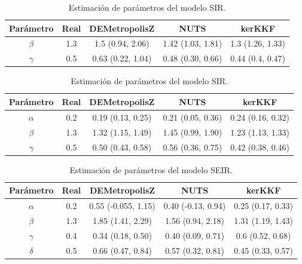 \begin{table}[h!]
    \centering
    \caption{Estimación de parámetros del modelo SIR.} 
    \begin{tabular}{|c|c|c|c|c|}
    \hline
    \textbf{Parámetro} & \textbf{Real} & \textbf{DEMetropolisZ} & \textbf{NUTS} & \textbf{kerKKF}  \\ \hline
    $\beta$ & 1.3 & 1.5 (0.94, 2.06) & 1.42 (1.03, 1.81) & 1.3 (1.26, 1.33) \\ \hline
    $\gamma$ & 0.5 & 0.63 (0.22, 1.04) & 0.48 (0.30, 0.66) & 0.44 (0.4, 0.47) \\ \hline
    \end{tabular}
    \label{tab:SIR_params}
\end{table}

\begin{table}[h!]
    \centering
    \caption{Estimación de parámetros del modelo SIR.} 
    \begin{tabular}{|c|c|c|c|c|}
    \hline
    \textbf{Parámetro}& \textbf{Real} & \textbf{DEMetropolisZ} & \textbf{NUTS} & \textbf{kerKKF}  \\ \hline
    $\alpha$ & 0.2 & 0.19 (0.13, 0.25) & 0.21 (0.05, 0.36) & 0.24 (0.16, 0.32) \\ \hline
    $\beta$ & 1.3 & 1.32 (1.15, 1.49) & 1.45 (0.99, 1.90) & 1.23 (1.13, 1.33) \\ \hline
    $\gamma$ & 0.5 & 0.50 (0.43, 0.58) & 0.56 (0.36, 0.75) & 0.42 (0.38, 0.46) \\ \hline
    \end{tabular}
    \label{tab:SIR_params}
\end{table}

\begin{table}[h!]
    \centering
    \caption{Estimación de parámetros del modelo SEIR.} 
    \begin{tabular}{|c|c|c|c|c|}
    \hline
    \textbf{Parámetro}& \textbf{Real} & \textbf{DEMetropolisZ} & \textbf{NUTS} & \textbf{kerKKF}  \\ \hline
    $\alpha$ & 0.2 & 0.55 (-0.055, 1.15) & 0.40 (-0.13, 0.94) & 0.25 (0.17, 0.33) \\ \hline
    $\beta$ & 1.3 & 1.85 (1.41, 2.29) & 1.56 (0.94, 2.18) & 1.31 (1.19, 1.43)\\  \hline
    $\gamma$ & 0.4 & 0.34 (0.18, 0.50) & 0.40 (0.09, 0.71) & 0.6 (0.52, 0.68)\\ \hline
    $\delta$ & 0.5 & 0.66 (0.47, 0.84) & 0.57 (0.32, 0.81) & 0.45 (0.33, 0.57)\\ \hline
    \end{tabular}
    \label{tab:SIR_params}
\end{table}


